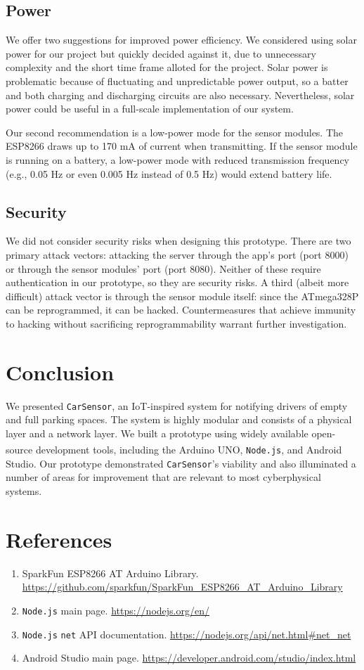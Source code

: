 \documentclass[conference]{IEEEtran}
\begin{document}
\subsection{Power}
We offer two suggestions for improved power efficiency. We considered using solar power for our project but quickly decided against it, due to unnecessary complexity and the short time frame alloted for the project. Solar power is problematic because of fluctuating and unpredictable power output, so a batter and both charging and discharging circuits are also necessary. Nevertheless, solar power could be useful in a full-scale implementation of our system.

Our second recommendation is a low-power mode for the sensor modules. The ESP8266 draws up to 170 mA of current when transmitting. If the sensor module is running on a battery, a low-power mode with reduced transmission frequency (e.g., 0.05 Hz or even 0.005 Hz instead of 0.5 Hz) would extend battery life.
\subsection{Security}
We did not consider security risks when designing this prototype. There are two primary attack vectors: attacking the server through the app's port (port 8000) or through the sensor modules' port (port 8080). Neither of these require authentication in our prototype, so they are security risks. A third (albeit more difficult) attack vector is through the sensor module itself: since the ATmega328P can be reprogrammed, it can be hacked. Countermeasures that achieve immunity to hacking without sacrificing reprogrammability warrant further investigation.
\section{Conclusion}
We presented \texttt{CarSensor}, an IoT-inspired system for notifying drivers of empty and full parking spaces. The system is highly modular and consists of a physical layer and a network layer. We built a prototype using widely available open-source development tools, including the Arduino UNO, \texttt{Node.js}\textsuperscript{\textregistered}, and Android Studio. Our prototype demonstrated \texttt{CarSensor}'s viability and also illuminated a number of areas for improvement that are relevant to most cyberphysical systems.

\section*{References}
\begin{enumerate}
\item SparkFun ESP8266 AT Arduino Library. \url{https://github.com/sparkfun/SparkFun_ESP8266_AT_Arduino_Library}
\item \texttt{Node.js} main page. \url{https://nodejs.org/en/}
\item \texttt{Node.js} \texttt{net} API documentation. \url{https://nodejs.org/api/net.html\#net_net}
\item Android Studio main page. \url{https://developer.android.com/studio/index.html}

\end{enumerate}
\end{document}
